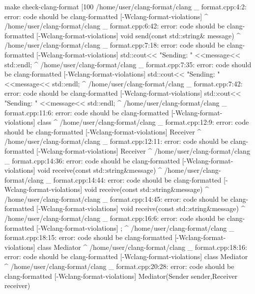 \begin{shell}
make check-clang-format
[100%
/home/user/clang-format/clang _ format.cpp:4:2: error: code should be
clang-formatted [-Wclang-format-violations]
{
 ^
/home/user/clang-format/clang _ format.cpp:6:42: error: code should be
clang-formatted [-Wclang-format-violations]
    void send(const std::string& message){
                                       ^
/home/user/clang-format/clang _ format.cpp:7:18: error: code should be
clang-formatted [-Wclang-format-violations]
        std::cout<< "Sending: " <<message<< std::endl;
                  ^
/home/user/clang-format/clang _ format.cpp:7:35: error: code should be
clang-formatted [-Wclang-format-violations]
        std::cout<< "Sending: " <<message<< std::endl;
                                  ^
/home/user/clang-format/clang _ format.cpp:7:42: error: code should be
clang-formatted [-Wclang-format-violations]
        std::cout<< "Sending: " <<message<< std::endl;
                                         ^
/home/user/clang-format/clang _ format.cpp:11:6: error: code should be
clang-formatted [-Wclang-format-violations]
class
     ^
/home/user/clang-format/clang _ format.cpp:12:9: error: code should be
clang-formatted [-Wclang-format-violations]
Receiver {
        ^
/home/user/clang-format/clang _ format.cpp:12:11: error: code should be
clang-formatted [-Wclang-format-violations]
Receiver {
          ^
/home/user/clang-format/clang _ format.cpp:14:36: error: code should be
clang-formatted [-Wclang-format-violations]
    void receive(const std::string&message){
                                   ^
/home/user/clang-format/clang _ format.cpp:14:44: error: code should be
clang-formatted [-Wclang-format-violations]
    void receive(const std::string&message){
                                            ^
/home/user/clang-format/clang _ format.cpp:14:45: error: code should be
clang-formatted [-Wclang-format-violations]
    void receive(const std::string&message){
                                             ^
/home/user/clang-format/clang _ format.cpp:16:6: error: code should be
clang-formatted [-Wclang-format-violations]
    }};
^
/home/user/clang-format/clang _ format.cpp:18:15: error: code should be
clang-formatted [-Wclang-format-violations]
class Mediator{
      ^
/home/user/clang-format/clang _ format.cpp:18:16: error: code should be
clang-formatted [-Wclang-format-violations]
class Mediator{
              ^
/home/user/clang-format/clang _ format.cpp:20:28: error: code should be
clang-formatted [-Wclang-format-violations]
    Mediator(Sender sender,Receiver receiver)
}}}}}}}
\end{shell}
